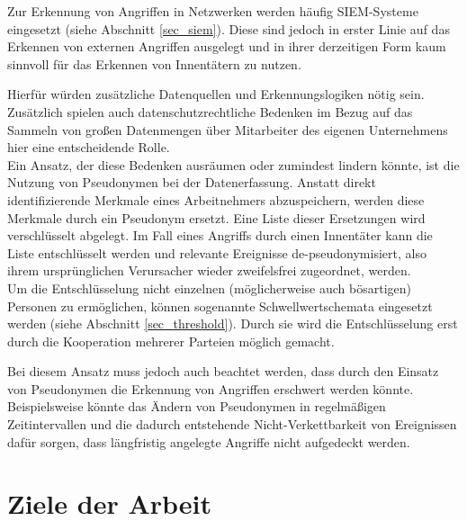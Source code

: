 \documentclass[
    fontsize=12pt,
    headings=small,
    parskip=half,           %
    bibliography=totoc,
    numbers=noenddot,       %
    open=any,               %
    ]{scrreprt}
\begin{document}
Zur Erkennung von Angriffen in Netzwerken werden häufig SIEM-Systeme eingesetzt (siehe Abschnitt \ref{sec_siem}). Diese sind jedoch in erster Linie auf das Erkennen von externen Angriffen ausgelegt und in ihrer derzeitigen Form kaum sinnvoll für das Erkennen von Innentätern zu nutzen. 

Hierfür würden zusätzliche Datenquellen und Erkennungslogiken nötig sein. Zusätzlich spielen auch  datenschutzrechtliche Bedenken im Bezug auf das Sammeln von großen Datenmengen über Mitarbeiter des eigenen Unternehmens hier eine entscheidende Rolle. \\
Ein Ansatz, der diese Bedenken ausräumen oder zumindest lindern könnte, ist die Nutzung von Pseudonymen bei der Datenerfassung. Anstatt direkt identifizierende Merkmale eines Arbeitnehmers abzuspeichern, werden diese Merkmale durch ein Pseudonym ersetzt. Eine Liste dieser Ersetzungen wird verschlüsselt abgelegt. Im Fall eines Angriffs durch einen Innentäter kann die Liste entschlüsselt werden und relevante Ereignisse de-pseudonymisiert, also ihrem ursprünglichen Verursacher wieder zweifelsfrei zugeordnet, werden.\\
Um die Entschlüsselung nicht einzelnen (möglicherweise auch bösartigen) Personen zu ermöglichen, können sogenannte Schwellwertschemata eingesetzt werden (siehe Abschnitt \ref{sec_threshold}). Durch sie wird die Entschlüsselung erst durch die Kooperation mehrerer Parteien möglich gemacht.

Bei diesem Ansatz muss jedoch auch beachtet werden, dass durch den Einsatz von Pseudonymen die Erkennung von Angriffen erschwert werden könnte. Beispielsweise könnte das Ändern von Pseudonymen in regelmäßigen Zeitintervallen und die dadurch entstehende Nicht-Verkettbarkeit von Ereignissen dafür sorgen, dass längfristig angelegte Angriffe nicht aufgedeckt werden.

\section{Ziele der Arbeit}




\end{document}
